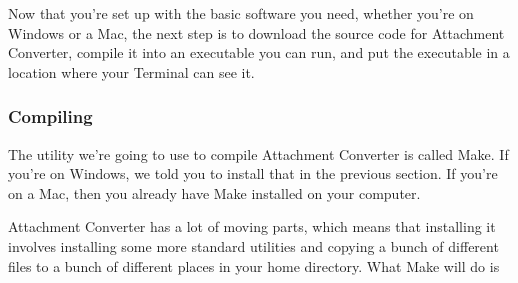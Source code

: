 \documentclass[11pt]{article}
\begin{document}
Now that you're set up with the basic software you need, whether
you're on Windows or a Mac, the next step is to download the source
code for Attachment Converter, compile it into an executable you can
run, and put the executable in a location where your Terminal can see
it.

\subsubsection*{Compiling}
\label{sec:orgb87093e}

The utility we're going to use to compile Attachment Converter is
called Make.  If you're on Windows, we told you to install that in the
previous section.  If you're on a Mac, then you already have Make
installed on your computer.

Attachment Converter has a lot of moving parts, which means that
installing it involves installing some more standard utilities and
copying a bunch of different files to a bunch of different places in
your home directory.  What Make will do is 
\end{document}
